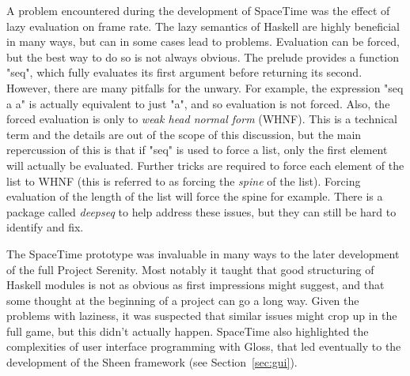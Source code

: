 A problem encountered during the development of SpaceTime was the effect of lazy evaluation on frame rate. The lazy semantics of Haskell are highly beneficial in many ways, but can in some cases lead to problems. Evaluation can be forced, but the best way to do so is not always obvious. The prelude provides a function "seq", which fully evaluates its first argument before returning its second. However, there are many pitfalls for the unwary. For example, the expression "seq a a" is actually equivalent to just "a", and so evaluation is not forced. Also, the forced evaluation is only to \emph{weak head normal form} (WHNF). This is a technical term and the details are out of the scope of this discussion, but the main repercussion of this is that if "seq" is used to force a list, only the first element will actually be evaluated. Further tricks are required to force each element of the list to WHNF (this is referred to as forcing the \emph{spine} of the list). Forcing evaluation of the length of the list will force the spine for example. There is a package called \emph{deepseq} to help address these issues, but they can still be hard to identify and fix.

The SpaceTime prototype was invaluable in many ways to the later development of the full Project Serenity. Most notably it taught that good structuring of Haskell modules is not as obvious as first impressions might suggest, and that some thought at the beginning of a project can go a long way. Given the problems with laziness, it was suspected that similar issues might crop up in the full game, but this didn't actually happen. SpaceTime also highlighted the complexities of user interface programming with Gloss, that led eventually to the development of the Sheen framework (see Section~\ref{sec:gui}).
